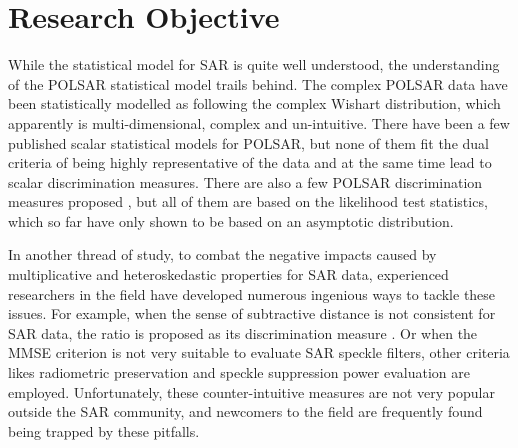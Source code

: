 \section{Research Objective}


While
                the statistical model for SAR is quite well understood,
the
                understanding of the POLSAR statistical model trails behind.
The
                complex POLSAR data have been statistically modelled as
                following the complex Wishart distribution, which
                apparently is multi-dimensional, complex and
                un-intuitive.
There
                have been a few published scalar statistical models for
                POLSAR, \cite{Alberga_2008_IJRS_4129, Joughin_1994_TGRS_562, Lee_1994_TGRS_1017, Touzi_1996_TGRS_519, Barakat_1985_IJOptics, Eliyahu_1993_PhysRevE_2881, Brosseau_1995_AppliedOptics_4788} but none of them fit the dual criteria of being
                highly representative of the data and at the same time
                lead to scalar discrimination measures.
There
                are also a few POLSAR discrimination measures proposed \cite{Lee_1994_IJRS_2299, Kersten_2005_TGRS_519, Lee_2011_IGARSS_3740, Cao_2007_TGRS_3454, Conradsen_2003_TGRS_4},
                but all of them are based on the likelihood test
                statistics, which so far have only shown to be based on an
                asymptotic distribution.

 In
                another thread of study, to combat the negative
                impacts caused by multiplicative and heteroskedastic
                properties for SAR data, experienced researchers in the
                field have developed numerous ingenious ways to tackle
                these issues.
For
                example, when the sense of subtractive distance is not
                consistent for SAR data, the ratio is proposed as its
                discrimination measure \cite{Rignot_1993_TGRS_896}.
Or
                when the MMSE criterion is not very suitable to evaluate
                SAR speckle filters, other criteria likes radiometric
                preservation and speckle suppression power evaluation
                are employed. 
Unfortunately,
                these counter-intuitive measures are not very popular
                outside the SAR community, and newcomers to the field
                are frequently found being trapped by these pitfalls.

